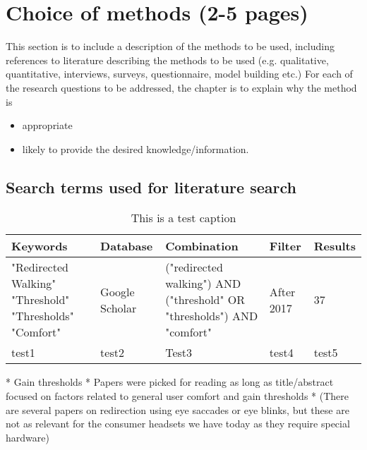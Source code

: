 \chapter{Choice of methods (2-5 pages)}
This section is to include a description of the methods to be used,
including references to literature describing the methods to be used
(e.g. qualitative, quantitative, interviews, surveys,
questionnaire,  model building etc.)
For each of the research questions to be addressed,
the chapter is to explain why the method is
\begin{itemize}
\item appropriate
\item likely to provide the desired knowledge/information.
\end{itemize}

\section{Search terms used for literature search}
\begin{table}[h!]
\centering
\begin{tabularx}{\textwidth}{|X|m{1.5cm}|X|m{1.5cm}|m{1.25cm}|} 
\hline
Keywords & Database & Combination & Filter & Results\\ 
\hline
"Redirected Walking"\newline
"Threshold"\newline
"Thresholds"\newline
"Comfort"& Google Scholar & ("redirected walking") AND ("threshold" OR "thresholds") AND "comfort" & After 2017 & 37\\ 
\hline
test1 & test2 & Test3 & test4 & test5\\ 
\hline
\end{tabularx}
\caption{This is a test caption}
\label{table:literaturekeywords}
\end{table}
    
    * Gain thresholds
        * Papers were picked for reading as long as title/abstract focused on factors related to general user comfort and gain thresholds
        * (There are several papers on redirection using eye saccades or eye blinks, but these are not as relevant for the consumer headsets we have today as they require special hardware)